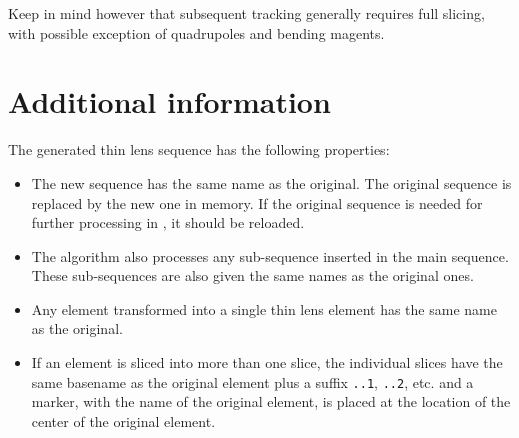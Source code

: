 Keep in mind however that subsequent tracking generally requires full
slicing, with possible exception of quadrupoles and bending magents. 


\section{Additional information}

The generated thin lens sequence has the following properties: 
\begin{itemize}
\item The new sequence has the same name as the original. The original sequence
  is replaced by the new one in memory. If the original sequence is
  needed for further processing in \madx, it should be reloaded.
\item The algorithm also processes any sub-sequence inserted in the main
  sequence. These sub-sequences are also given the same names as the
  original ones. 
\item Any element transformed into a single thin lens element has the
  same name as the original. 
\item If an element is sliced into more than one slice, the individual
  slices have the same basename as the original element plus a suffix 
  {\tt ..1}, {\tt ..2}, etc. and a marker, with the name of the original
  element, is placed at the location of the center of the original element.
\end{itemize}


